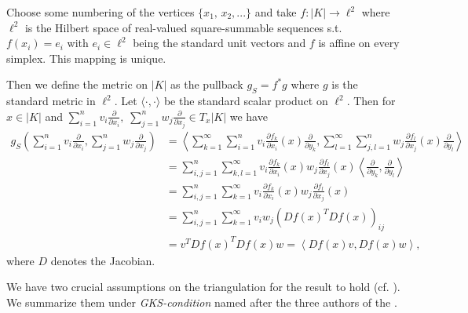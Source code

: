 \documentclass[12pt,a4paper]{article}
\begin{document}
Choose some numbering of the vertices $\{ x_1,\, x_2, ... \}$ and
take $f: |K| \rightarrow \ell^2$ where $\ell^2$ is the 
Hilbert space of real-valued square-summable sequences s.t. $f(x_i) = e_i$ 
with $e_i \in \ell^2$ being the standard unit vectors and $f$ is affine on 
every simplex. This mapping is unique.%

Then we define the metric on $|K|$ as the pullback $g_S = f^*g$ 
where $g$ is the standard metric in $\ell^2$. Let $\langle \cdot , 
\cdot \rangle$ be the standard scalar product on $\ell^2$. Then for $x \in |K|$ 
and $\sum_{i=1}^n v_i \frac{\partial}{\partial x_i}, \; 
\sum_{j=1}^n w_j \frac{\partial}{\partial x_j} \in T_x |K|$ we have 
\begin{align*}
g_S\left(\sum_{i=1}^n v_i \frac{\partial}{\partial x_i}, 
\sum_{j=1}^n w_j \frac{\partial}{\partial x_j}\right) &= 
\left\langle \sum_{k=1}^\infty \sum_{i=1}^n v_i 
\frac{\partial f_k}{\partial x_i} (x)
\frac{\partial }{\partial y_k}, 
\sum_{l=1}^\infty \sum_{j,l=1}^n w_j \frac{\partial f_l}{\partial x_j} (x)
\frac{\partial }{\partial y_l} \right\rangle \\   
&= \sum_{i,j=1}^n \sum_{k,l=1}^\infty v_i \frac{\partial f_k}{\partial x_i} (x)
w_j \frac{\partial f_l}{\partial x_j} (x) 
\left\langle \frac{\partial }{\partial y_k}, \frac{\partial }{\partial y_l} 
\right\rangle\\
&= \sum_{i,j=1}^n \sum_{k=1}^\infty v_i \frac{\partial f_k}{\partial x_i} (x)
w_j \frac{\partial f_l}{\partial x_j} (x)\\
&= \sum_{i,j=1}^n \sum_{k=1}^\infty v_i w_j \left( Df(x)^T Df(x) \right)_{ij} \\
&= v^T Df(x)^T Df(x) w = \left\langle Df(x) v, Df(x) w \right\rangle,
\end{align*}
where $D$ denotes the Jacobian.

We have two crucial assumptions on the triangulation for the result to hold 
(cf. \cite[p.194]{goldshtein}). We summarize them under 
\textit{GKS-condition} named after the three authors of the \cite{goldshtein}.
\end{document}
